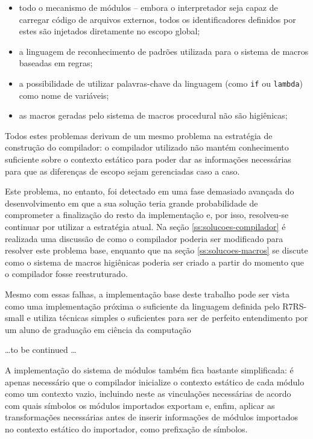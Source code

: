 \begin{itemize}

\item todo o mecanismo de módulos -- embora o interpretador seja capaz de carregar 
código de arquivos externos, todos os identificadores definidos por estes são 
injetados diretamente no escopo global;

\item a linguagem de reconhecimento de padrões utilizada para o sistema de macros
baseadas em regras;

\item a possibilidade de utilizar palavras-chave da linguagem (como \texttt{if} ou
\texttt{lambda}) como nome de variáveis;

\item as macros geradas pelo sistema de macros procedural não são higiênicas;

\end{itemize}

Todos estes problemas derivam de um mesmo problema na estratégia de construção do 
compilador: o compilador utilizado não mantém conhecimento suficiente sobre o 
contexto estático para poder dar as informações necessárias para que as diferenças
de escopo sejam gerenciadas caso a caso.

Este problema, no entanto, foi detectado em uma fase demasiado avançada do
desenvolvimento em que a sua solução teria grande probabilidade de comprometer
a finalização do resto da implementação e, por isso, resolveu-se continuar por
utilizar a estratégia atual. Na seção \ref{ss:solucoes-compilador} é realizada
uma discussão de como o compilador poderia ser modificado para resolver este
problema base, enquanto que na seção \ref{ss:solucoes-macros} se discute como
o sistema de macros higiênicas poderia ser criado a partir do momento que o
compilador fosse reestruturado.

Mesmo com essas falhas, a implementação base deste trabalho pode ser vista como
uma implementação próxima o suficiente da linguagem definida pelo \acs{R7RS}-small
e utiliza técnicas simples o suficientes para ser de perfeito entendimento por um
aluno de graduação em ciência da computação

\ldots to be continued \ldots




A implementação do sistema de módulos também fica bastante simplificada: é
apenas necessário que o compilador inicialize o contexto estático de cada
módulo como um contexto vazio, incluindo neste as vinculações necessárias de
acordo com quais símbolos os módulos importados exportam e, enfim, aplicar as
transformações necessárias antes de inserir informações de módulos importados
no contexto estático do importador, como prefixação de símbolos.


